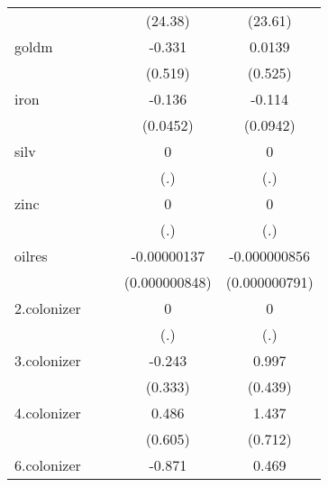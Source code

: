 {\begin{tabular}{l*{4}{c}}
            &                     &                     &     (24.38)         &     (23.61)         \\
[1em]
goldm       &                     &                     &      -0.331         &      0.0139         \\
            &                     &                     &     (0.519)         &     (0.525)         \\
[1em]
iron        &                     &                     &      -0.136\sym{**} &      -0.114         \\
            &                     &                     &    (0.0452)         &    (0.0942)         \\
[1em]
silv        &                     &                     &           0         &           0         \\
            &                     &                     &         (.)         &         (.)         \\
[1em]
zinc        &                     &                     &           0         &           0         \\
            &                     &                     &         (.)         &         (.)         \\
[1em]
oilres      &                     &                     & -0.00000137         &-0.000000856         \\
            &                     &                     &(0.000000848)         &(0.000000791)         \\
[1em]
2.colonizer &                     &                     &           0         &           0         \\
            &                     &                     &         (.)         &         (.)         \\
[1em]
3.colonizer &                     &                     &      -0.243         &       0.997\sym{*}  \\
            &                     &                     &     (0.333)         &     (0.439)         \\
[1em]
4.colonizer &                     &                     &       0.486         &       1.437         \\
            &                     &                     &     (0.605)         &     (0.712)         \\
[1em]
6.colonizer &                     &                     &      -0.871\sym{**} &       0.469         \\

\end{tabular}}
